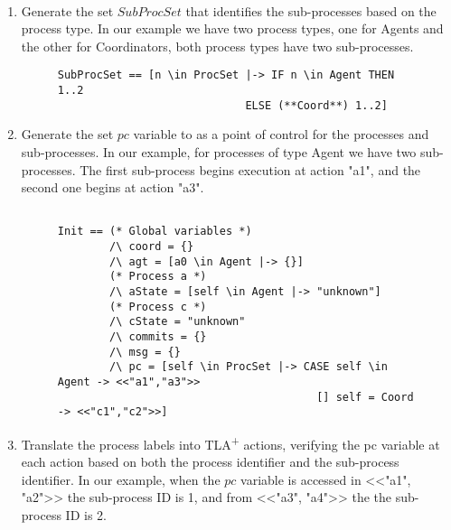 \documentclass{thesul}
\newcommand{\tlaplus}{TLA\textsuperscript{+}\xspace}
\begin{document}
\hfill\\
\begin{enumerate}

\item Generate the set $SubProcSet$ that identifies the sub-processes based on the process type.
In our example we have two process types, one for Agents and the other for Coordinators, both process types have two sub-processes.

\FloatBarrier
\begin{figure}[!h]
\label{2pcSubTla}
\begin{lstlisting}[caption = Distributed-PlusCal Translation- SubProcSet, frame = tlrb, firstnumber = 1]
SubProcSet == [n \in ProcSet |-> IF n \in Agent THEN 1..2
                             ELSE (**Coord**) 1..2]

\end{lstlisting}
\end{figure}
\FloatBarrier

\item Generate the set $pc$ variable to as a point of control for the processes and sub-processes.
In our example, for processes of type Agent we have two sub-processes. The first sub-process begins execution at action "a1", and the second one begins at action "a3".
\hfill\\

\FloatBarrier
\begin{figure}[!h]
\begin{lstlisting}[caption = TLA+ translation for Sub-Processes, frame = tlrb, firstnumber = 1]

Init == (* Global variables *)
        /\ coord = {}
        /\ agt = [a0 \in Agent |-> {}]
        (* Process a *)
        /\ aState = [self \in Agent |-> "unknown"]
        (* Process c *)
        /\ cState = "unknown"
        /\ commits = {}
        /\ msg = {}
        /\ pc = [self \in ProcSet |-> CASE self \in Agent -> <<"a1","a3">>
                                        [] self = Coord -> <<"c1","c2">>]
\end{lstlisting}
\end{figure}
\FloatBarrier

\item Translate the process labels into \tlaplus actions, verifying the pc variable at each action based on both the process identifier and the sub-process identifier.
In our example, when the $pc$ variable is accessed in <<"a1", "a2">> the sub-process ID is 1, and from <<"a3", "a4">> the the sub-process ID is 2.


\end{enumerate}
\end{document}
